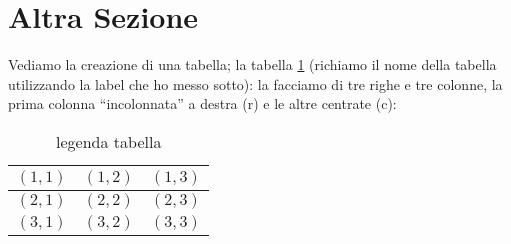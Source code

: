 \documentclass[12pt,a4paper,openright,twoside]{report}
\begin{document}
                                        \section{Altra Sezione}                 %
                                        Vediamo la creazione di una tabella; la tabella \ref{tab:uno}
                                        (richiamo il nome della tabella utilizzando la label che ho messo sotto):
                                        la facciamo di tre righe e tre colonne, la prima colonna
                                        ``incolonnata'' a destra (r) e le altre centrate (c):\\
                                        \begin{table}[h]                        %
                                        \begin{center}                          %
                                        \begin{tabular}{r|c|c}                  %
                                        \hline \hline                           %
                                        $(1,1)$ & $(1,2)$ & $(1,3)$\\           %
                                        \hline                                  %
                                        $(2,1)$ & $(2,2)$ & $(2,3)$\\           %
                                        \hline                                  %
                                        $(3,1)$ & $(3,2)$ & $(3,3)$\\
                                        \hline \hline                           %
                                        \end{tabular}
                                        \caption[legenda elenco tabelle]{legenda tabella}\label{tab:uno}
                                        \end{center}
                                        \end{table}
\end{document}
